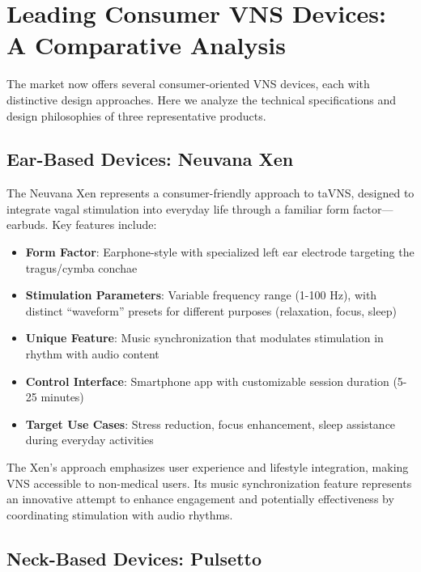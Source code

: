 \documentclass[
  Letterpaper,
]{scrbook}
\providecommand{\tightlist}{%
  \setlength{\itemsep}{0pt}\setlength{\parskip}{0pt}}\usepackage{longtable,booktabs,array}
\begin{document}
\section{Leading Consumer VNS Devices: A Comparative
Analysis}\label{leading-consumer-vns-devices-a-comparative-analysis}

The market now offers several consumer-oriented VNS devices, each with
distinctive design approaches. Here we analyze the technical
specifications and design philosophies of three representative products.

\subsection{Ear-Based Devices: Neuvana
Xen}\label{ear-based-devices-neuvana-xen}

The Neuvana Xen represents a consumer-friendly approach to taVNS,
designed to integrate vagal stimulation into everyday life through a
familiar form factor---earbuds. Key features include:

\begin{itemize}
\tightlist
\item
  \textbf{Form Factor}: Earphone-style with specialized left ear
  electrode targeting the tragus/cymba conchae
\item
  \textbf{Stimulation Parameters}: Variable frequency range (1-100 Hz),
  with distinct ``waveform'' presets for different purposes (relaxation,
  focus, sleep)
\item
  \textbf{Unique Feature}: Music synchronization that modulates
  stimulation in rhythm with audio content
\item
  \textbf{Control Interface}: Smartphone app with customizable session
  duration (5-25 minutes)
\item
  \textbf{Target Use Cases}: Stress reduction, focus enhancement, sleep
  assistance during everyday activities
\end{itemize}

The Xen's approach emphasizes user experience and lifestyle integration,
making VNS accessible to non-medical users. Its music synchronization
feature represents an innovative attempt to enhance engagement and
potentially effectiveness by coordinating stimulation with audio
rhythms.

\subsection{Neck-Based Devices:
Pulsetto}\label{neck-based-devices-pulsetto}
\end{document}
